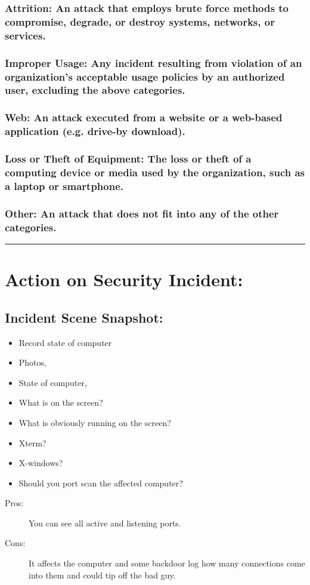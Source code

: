 \documentclass[british]{article}
\begin{document}
\subsubsection{Attrition: An attack that employs brute force methods to compromise,
degrade, or destroy systems, networks, or services. }

\subsubsection{Improper Usage: Any incident resulting from violation of an organization\textquoteright s
acceptable usage policies by an authorized user, excluding the above
categories.}

\subsubsection{Web: An attack executed from a website or a web-based application
(e.g. drive-by download).}

\subsubsection{Loss or Theft of Equipment: The loss or theft of a computing device
or media used by the organization, such as a laptop or smartphone.}

\subsubsection{Other: An attack that does not fit into any of the other categories.}

\rule[0.5ex]{0.75\columnwidth}{1pt}

\section{Action on Security Incident:}

\subsection{Incident Scene Snapshot:}
\begin{itemize}
\item Record state of computer
\item Photos,
\item State of computer,
\item What is on the screen?
\item What is obviously running on the screen?
\item Xterm?
\item X-windows?
\item Should you port scan the affected computer?
\end{itemize}
\begin{description}
\item [{Pros:}] You can see all active and listening ports.
\item [{Cons:}] It affects the computer and some backdoor log how many
connections come into them and could tip off the bad guy.
\end{description}
\end{document}
